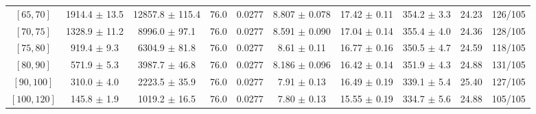 \begin{tabular}{c||c|c|c|c|c|c|c||c|c}
$[65, 70]$ & 1914.4 $\pm$ 13.5 & 12857.8 $\pm$ 115.4 & 76.0 & 0.0277 & 8.807 $\pm$ 0.078 & 17.42 $\pm$ 0.11 & 354.2 $\pm$ 3.3 & 24.23 & 126/105\\
$[70, 75]$ & 1328.9 $\pm$ 11.2 & 8996.0 $\pm$ 97.1 & 76.0 & 0.0277 & 8.591 $\pm$ 0.090 & 17.04 $\pm$ 0.14 & 355.4 $\pm$ 4.0 & 24.36 & 128/105\\
$[75, 80]$ & 919.4 $\pm$ 9.3 & 6304.9 $\pm$ 81.8 & 76.0 & 0.0277 & 8.61 $\pm$ 0.11 & 16.77 $\pm$ 0.16 & 350.5 $\pm$ 4.7 & 24.59 & 118/105\\
$[80, 90]$ & 571.9 $\pm$ 5.3 & 3987.7 $\pm$ 46.8 & 76.0 & 0.0277 & 8.186 $\pm$ 0.096 & 16.42 $\pm$ 0.14 & 351.9 $\pm$ 4.3 & 24.88 & 131/105\\
$[90, 100]$ & 310.0 $\pm$ 4.0 & 2223.5 $\pm$ 35.9 & 76.0 & 0.0277 & 7.91 $\pm$ 0.13 & 16.49 $\pm$ 0.19 & 339.1 $\pm$ 5.4 & 25.40 & 127/105\\
$[100, 120]$ & 145.8 $\pm$ 1.9 & 1019.2 $\pm$ 16.5 & 76.0 & 0.0277 & 7.80 $\pm$ 0.13 & 15.55 $\pm$ 0.19 & 334.7 $\pm$ 5.6 & 24.88 & 105/105\\
\end{tabular}
